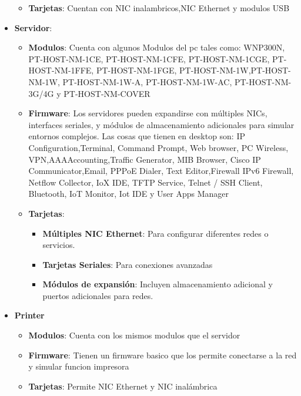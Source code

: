 \documentclass{article}
\begin{document}
\begin{itemize}
\begin{itemize}
                \item\textbf{Tarjetas}: Cuentan con NIC inalambricos,NIC Ethernet y modulos USB
            \end{itemize}
           \item\textbf{Servidor}:
           \begin{itemize}
                \item\textbf{Modulos}: Cuenta con algunos Modulos del pc tales como: WNP300N, PT-HOST-NM-1CE, PT-HOST-NM-1CFE, PT-HOST-NM-1CGE, PT-HOST-NM-1FFE, PT-HOST-NM-1FGE, PT-HOST-NM-1W,PT-HOST-NM-1W, PT-HOST-NM-1W-A, PT-HOST-NM-1W-AC, PT-HOST-NM-3G/4G y PT-HOST-NM-COVER
                \item\textbf{Firmware}: Los servidores pueden expandirse con múltiples NICs, interfaces seriales, y módulos de almacenamiento adicionales para simular entornos complejos.
                Las cosas que tienen en desktop son:
                IP Configuration,Terminal, Command Prompt, Web browser, PC Wireless, VPN,AAAAccounting,Traffic Generator, MIB Browser, Cisco IP Communicator,Email, PPPoE Dialer, Text Editor,Firewall IPv6 Firewall, Netflow Collector, IoX IDE, TFTP Service, Telnet / SSH Client, Bluetooth, IoT Monitor, Iot IDE y User Apps Manager
                \item\textbf{Tarjetas}:
                \begin{itemize}
                    \item\textbf{Múltiples NIC Ethernet}: Para configurar diferentes redes o servicios. 
                    \item\textbf{Tarjetas Seriales}: Para conexiones avanzadas 
                    \item\textbf{Módulos de expansión}: Incluyen almacenamiento adicional y puertos adicionales para redes.
                \end{itemize}
            \end{itemize}
           \item\textbf{Printer}
           \begin{itemize}
                \item\textbf{Modulos}: Cuenta con los mismos modulos que el servidor
                \item\textbf{Firmware}: Tienen un firmware basico que los permite conectarse a la red y simular funcion impresora
                \item\textbf{Tarjetas}: Permite NIC Ethernet y NIC inalámbrica
            \end{itemize}
       \end{itemize}
\end{document}
